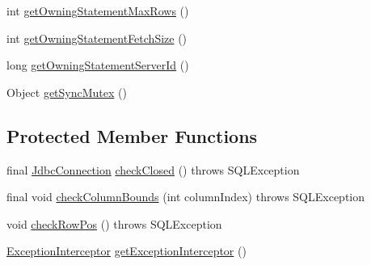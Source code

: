 \begin{DoxyCompactItemize}
int \mbox{\hyperlink{classcom_1_1mysql_1_1cj_1_1jdbc_1_1result_1_1_result_set_impl_ab94f324aa47731eaf93cc3c67b6ab07d}{get\+Owning\+Statement\+Max\+Rows}} ()
\item 
int \mbox{\hyperlink{classcom_1_1mysql_1_1cj_1_1jdbc_1_1result_1_1_result_set_impl_a83dec80b3e36ced954f4965ca869df4e}{get\+Owning\+Statement\+Fetch\+Size}} ()
\item 
long \mbox{\hyperlink{classcom_1_1mysql_1_1cj_1_1jdbc_1_1result_1_1_result_set_impl_ab47d7700a4925c8348d6e9ab8a7e80e1}{get\+Owning\+Statement\+Server\+Id}} ()
\item 
Object \mbox{\hyperlink{classcom_1_1mysql_1_1cj_1_1jdbc_1_1result_1_1_result_set_impl_a3dcbce7ef97301024277eb49d55fe26f}{get\+Sync\+Mutex}} ()
\end{DoxyCompactItemize}
\subsection*{Protected Member Functions}
\begin{DoxyCompactItemize}
\item 
final \mbox{\hyperlink{interfacecom_1_1mysql_1_1cj_1_1jdbc_1_1_jdbc_connection}{Jdbc\+Connection}} \mbox{\hyperlink{classcom_1_1mysql_1_1cj_1_1jdbc_1_1result_1_1_result_set_impl_a885fe4be94caed65d13223f1bb07a9f4}{check\+Closed}} ()  throws S\+Q\+L\+Exception 
\item 
final void \mbox{\hyperlink{classcom_1_1mysql_1_1cj_1_1jdbc_1_1result_1_1_result_set_impl_aeca9bb7a778cc8e2c991cae4b2698f67}{check\+Column\+Bounds}} (int column\+Index)  throws S\+Q\+L\+Exception 
\item 
void \mbox{\hyperlink{classcom_1_1mysql_1_1cj_1_1jdbc_1_1result_1_1_result_set_impl_ab264cbfab311f9cbf06129d88ee25664}{check\+Row\+Pos}} ()  throws S\+Q\+L\+Exception 
\item 
\mbox{\hyperlink{interfacecom_1_1mysql_1_1cj_1_1exceptions_1_1_exception_interceptor}{Exception\+Interceptor}} \mbox{\hyperlink{classcom_1_1mysql_1_1cj_1_1jdbc_1_1result_1_1_result_set_impl_a0843c7c9052f5458f7597a7dbb6fcc5e}{get\+Exception\+Interceptor}} ()
\end{DoxyCompactItemize}
